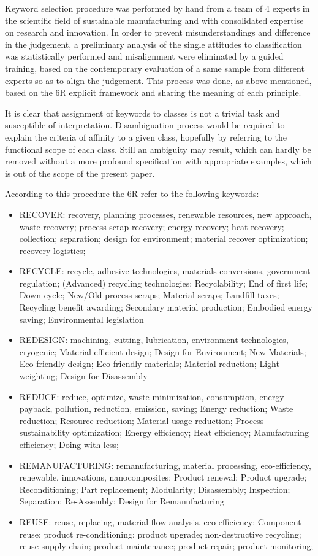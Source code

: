 \documentclass[]{book}
\providecommand{\tightlist}{%
  \setlength{\itemsep}{0pt}\setlength{\parskip}{0pt}}
\begin{document}
Keyword selection procedure was performed by hand from a team of 4
experts in the scientific field of sustainable manufacturing and with
consolidated expertise on research and innovation. In order to prevent
misunderstandings and difference in the judgement, a preliminary
analysis of the single attitudes to classification was statistically
performed and misalignment were eliminated by a guided training, based
on the contemporary evaluation of a same sample from different experts
so as to align the judgement. This process was done, as above mentioned,
based on the 6R explicit framework and sharing the meaning of each
principle.

It is clear that assignment of keywords to classes is not a trivial task
and susceptible of interpretation. Disambiguation process would be
required to explain the criteria of affinity to a given class, hopefully
by referring to the functional scope of each class. Still an ambiguity
may result, which can hardly be removed without a more profound
specification with appropriate examples, which is out of the scope of
the present paper.

According to this procedure the 6R refer to the following keywords:

\begin{itemize}
\tightlist
\item
  RECOVER: recovery, planning processes, renewable resources, new
  approach, waste recovery; process scrap recovery; energy recovery;
  heat recovery; collection; separation; design for environment;
  material recover optimization; recovery logistics;
\item
  RECYCLE: recycle, adhesive technologies, materials conversions,
  government regulation; (Advanced) recycling technologies;
  Recyclability; End of first life; Down cycle; New/Old process scraps;
  Material scraps; Landfill taxes; Recycling benefit awarding; Secondary
  material production; Embodied energy saving; Environmental legislation
\item
  REDESIGN: machining, cutting, lubrication, environment technologies,
  cryogenic; Material-efficient design; Design for Environment; New
  Materials; Eco-friendly design; Eco-friendly materials; Material
  reduction; Light- weighting; Design for Disassembly
\item
  REDUCE: reduce, optimize, waste minimization, consumption, energy
  payback, pollution, reduction, emission, saving; Energy reduction;
  Waste reduction; Resource reduction; Material usage reduction; Process
  sustainability optimization; Energy efficiency; Heat efficiency;
  Manufacturing efficiency; Doing with less;
\item
  REMANUFACTURING: remanufacturing, material processing, eco-efficiency,
  renewable, innovations, nanocomposites; Product renewal; Product
  upgrade; Reconditioning; Part replacement; Modularity; Disassembly;
  Inspection; Separation; Re-Assembly; Design for Remanufacturing
\item
  REUSE: reuse, replacing, material flow analysis, eco-efficiency;
  Component reuse; product re-conditioning; product upgrade;
  non-destructive recycling; reuse supply chain; product maintenance;
  product repair; product monitoring;
\end{itemize}
\end{document}
